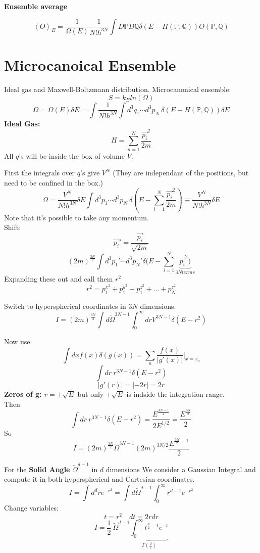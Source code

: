 \documentclass[11pt]{book}
\theoremstyle{definition}
\begin{document}
\textbf{Ensemble average}

\[ \left \langle   O \right \rangle_E = \frac{1}{\Omega(E)} \frac{1}{N!h^{3N}}\int D\mathbb{P} D \mathbb{Q} \delta(E-H(\mathbb{P},\mathbb{Q}))O(\mathbb{P},\mathbb{Q})\] 
\pagebreak
\section{Microcanoical Ensemble}
Ideal gas and Maxwell-Boltzmann distribution.
Microcanonical ensemble:
\[ S = k_B ln(\Omega) \] 
\[ \Omega = \Omega(E) \delta E  = \int \frac{1}{N!h^{3N}} \int d^3 q_1 \cdots d^3 p_N \: \delta (E- H(\mathbb{P}, \mathbb{Q})) \delta E \] 
\textbf{Ideal Gas:} 
\[ H = \sum_{n=1}^{N} \frac{\vec{p_i}^2}{2m}\] 
All $ q $'s will be inside the box of volume $ V $.

First the integrals over $ q $'s give $ V^{N} $ (They are independant of the positions, but need to be confined in the box.)
\[ \Omega = \frac{V^{N}}{N!h^{3N}} \delta E \int d^3p_1 \cdots d^3 p_N \: \delta (E - \sum_{i=1}^{N} \frac{\vec{p_i}^2}{2m}) \equiv \frac{V^{N}}{N! h^{3N}} \delta E \] 
Note that it's possible to take any momentum. \\
Shift:
\[ \vec{p_i}\prime = \frac{\vec{p_i}}{\sqrt{2m}} \]
\[(2m)^{\frac{3N}{2}} \int d^3p_1 \prime \cdots d^3p_N \prime \delta (E - \sum_{i=1}^{N} \underbrace{\vec{p_i}^2)}_{3N terms}\] 
Expanding these out and call them $ r^2 $
\[ r^2 = p_1^{{x}^2} + p_1^{{y}^2} + p_1^{{z}^2} + ... + p_N^{{z}^2} \] 
\begin{shaded*}
Switch to hyperspherical coordinates in $ 3N $ dimensions.
\[ I = (2m)^{\frac{3N}{2}} \int d \tilde \Omega^{3N-1} \int_0^{\infty} dr V^{3N-1} \delta (E-r^2)\] 
\end{shaded*}

Now use \[ \int dx f(x) \delta(g(x)) = \sum_{n} \frac{f(x)}{|g \prime (x)|} |_{x=x_n}\] 
\begin{equation}
	\label{eq:int-dr}
	\int dr \: r^{3N-1} \delta (E - r^2)
\end{equation} 
\[ |g \prime (r)| = |-2r| = 2r \] 
\textbf{Zeros of g: $ r = \pm \sqrt{E} $ } but only $ +\sqrt{E} $ is indside the integration range. \\
Then
\[ \int dr \: r^{3N-1} \delta (E - r^2) = \frac{E^{\frac{3N-1}{2}}}{2E^{1/2}} = \frac{E^{\frac{3N}{2}}}{2}\] 
So
\[ I = (2m)^{\frac{3N}{2}} \tilde \Omega^{3N-1} (2m)^{3N/2} \frac{E^{\frac{3N}{2}-1}}{2} \] 

For the \textbf{Solid Angle} $ \tilde \Omega^{d-1} $ in $ d $ dimensions 
We consider a Gaussian Integral and compute it in both hyperspherical and Cartesian coordinates.
\[ I = \int d^{d} r e^{-r^2} = \int d \tilde \Omega^{d-1} \int_0^{\infty} r^{d-1} e^{-r^2} \] 
Change variables:
\[ t = r^2 \quad dt = 2r dr \]
\[ I = \frac{1}{2} \: \tilde \Omega^{d-1} \underbrace{\int_0^{\infty} t^{\frac{d}{2}-1} e^{-t}}_{\Gamma(\frac{d}{2})}\]
\end{document}
